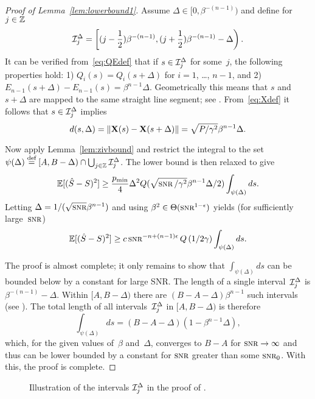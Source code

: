 \begin{proof}[Proof of Lemma~\ref{lem:lowerbound1}]
  Assume $\Delta \in [0, \beta^{-(n-1)})$ and define for $j \in \mathbb{Z}$
  \[ \mathcal{I}_j^\Delta = \left[ (j - \frac12 )\beta^{-(n-1)}, 
    (j + \frac12 ) \beta^{-(n-1)} - \Delta \right).\]
  It can be verified from~\eqref{eq:QEdef} that if $s \in \mathcal{I}_j^\Delta$ for
  some~$j$, the following properties hold: 1) $Q_i(s) = Q_i(s+\Delta)$ for
  $i=1$, \dots, $n-1$, and 2) $E_{n-1}(s+\Delta) - E_{n-1}(s) =
  \beta^{n-1}\Delta$. Geometrically this means that $s$ and~$s + \Delta$ are
  mapped to the same straight line segment; see .
  From~\eqref{eq:Xdef} it follows that $s \in \mathcal{I}_j^\Delta$ implies
  \begin{equation*}
    d(s, \Delta) = \|\mathbf{X}(s) - \mathbf{X}(s+\Delta)\| = \sqrt{P/\gamma^2}
    \beta^{n-1}\Delta.
  \end{equation*}

  Now apply Lemma~\ref{lem:zivbound} and restrict the integral to the
  set~$\psi(\Delta) \stackrel{\text{def}}{=} [A,B-\Delta) \cap \bigcup_{j\in\mathbb{Z}} \mathcal{I}_j^\Delta$. The
  lower bound is then relaxed to give
  \begin{equation*}
    \mse \ge \frac{\pmin}{4} \Delta^2 Q(\sqrt{\snr/\gamma^2} \beta^{n-1}
    \Delta/2) \int_{\psi(\Delta)} ds.
  \end{equation*}
  Letting $\Delta = 1/(\sqrt{\snr}\beta^{n-1})$ and using $\beta^2 \in
  \Theta(\snr^{1-\e})$ yields (for sufficiently large~$\snr$)
  \begin{equation*}
    \mse \ge c \snr^{-n+(n-1)\e} Q\left(1/2\gamma\right)
    \int_{\psi(\Delta)} ds.
  \end{equation*}

  The proof is almost complete; it only remains to show that
  $\int_{\psi(\Delta)}ds$ can be bounded below by a constant for large SNR. The
  length of a single interval~$\mathcal{I}_j^\Delta$ is $\beta^{-(n-1)} - \Delta$. Within
  $[A,B-\Delta)$ there are $(B-A-\Delta)\beta^{n-1}$ such intervals (see
  ). The total
  length of all intervals~$\mathcal{I}_j^\Delta$ in $[A, B-\Delta)$ is therefore
  \[ \int_{\psi(\Delta)} ds = (B-A-\Delta)
  (1 - \beta^{n-1}\Delta), \]
  which, for the given values of~$\beta$ and~$\Delta$, 
  converges to $B-A$ for $\snr \ra \infty$ and thus can be lower bounded by a
  constant for $\snr$ greater than some $\snr_0$. With this, the proof is
  complete.
\end{proof}

\begin{figure}
  \begin{center}
  \end{center}
  \caption{Illustration of the intervals $\mathcal{I}_j^\Delta$ in the proof of
  .}
  \label{fig:lowerbound1intervals}
\end{figure}

